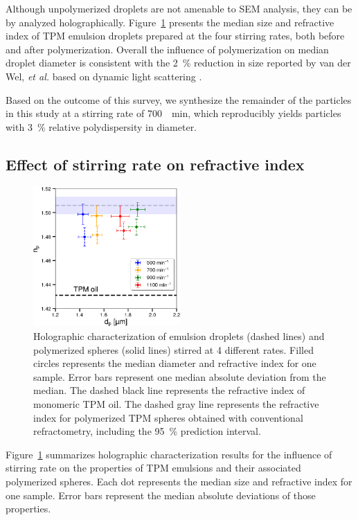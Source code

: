 \documentclass[journal=langd5,manuscript=article]{achemso}
\begin{document}
Although unpolymerized droplets are not amenable to SEM analysis,
they can be by analyzed holographically.
Figure~\ref{fig:jointspeed} presents the median size and refractive index
of TPM emulsion droplets prepared at the four stirring rates,
both before and after polymerization.
Overall the influence of polymerization on median droplet diameter is
consistent with the \SI{2}{\percent} reduction in size reported by
van der Wel, \emph{et al.}
based on dynamic light scattering \cite{vanderwel17}.

Based on the outcome of this survey, we synthesize
the remainder of the particles in this study
at a stirring rate of \SI{700}{\per\minute},
which reproducibly yields particles with
\SI{3}{\percent} relative polydispersity in diameter.

\subsection{Effect of stirring rate on refractive index}
\label{sec:stirindex}

\begin{figure}
  \centering
  \includegraphics[width=0.5\textwidth]{jointspeed}
  \caption{Holographic characterization of emulsion droplets
    (dashed lines) and polymerized spheres (solid lines)
    stirred at \num{4} different rates.
    Filled circles represents the median diameter and refractive index
    for one sample.  Error bars represent one median absolute 
    deviation from the median.
    The dashed black line represents the refractive index of monomeric
    TPM oil.
    The dashed gray line represents the refractive index for polymerized
    TPM spheres obtained with conventional refractometry, including
    the \SI{95}{\percent} prediction interval.}
  \label{fig:jointspeed}
\end{figure}

Figure~\ref{fig:jointspeed} summarizes holographic characterization
results for the influence of stirring rate on the properties of TPM
emulsions and their associated polymerized spheres.
Each dot represents the median size and refractive index for one sample.
Error bars represent the median absolute deviations of those properties.
\end{document}

